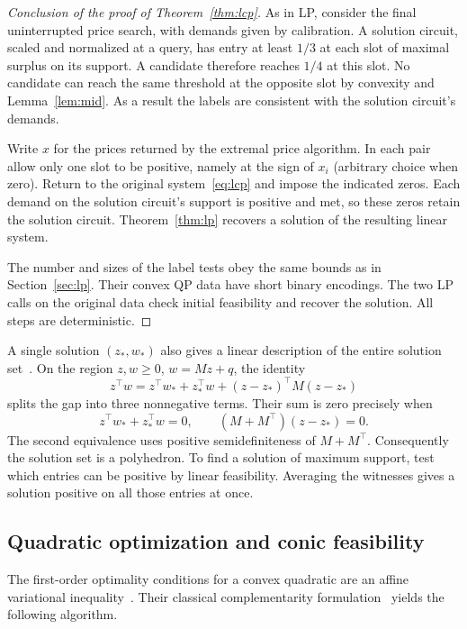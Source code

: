 \begin{proof}[Conclusion of the proof of Theorem~\ref{thm:lcp}]
As in LP, consider the final uninterrupted price search, with demands given by
calibration. A solution circuit, scaled and normalized at a query,
has entry at least \(1/3\) at each slot of maximal surplus on
its support. A candidate therefore reaches \(1/4\) at this slot.
No candidate can reach the same threshold at the opposite slot by convexity and
Lemma~\ref{lem:mid}. As a result the labels are consistent
with the solution circuit's demands.


Write \(x\) for the prices returned by the extremal price algorithm.
In each pair allow only one slot to be positive, namely at the
sign of \(x_i\) (arbitrary choice when zero).
Return to the original system~\eqref{eq:lcp}
and impose the indicated zeros.
Each demand on the solution circuit's support is positive and
met, so these zeros retain the solution circuit. Theorem~\ref{thm:lp}
recovers a solution of the resulting linear system.

The number and sizes of the label tests obey the same bounds as in
Section~\ref{sec:lp}. Their convex QP data have short binary
encodings. The two LP calls on the original data check initial
feasibility and recover the solution. All steps are deterministic.
\end{proof}

A single solution \((z_*,w_*)\) also gives a linear description of
the entire solution set~\cite{Man}. On the region \(z,w\ge0\),
\(w=Mz+q\), the identity
\[
 z^\top w=z^\top w_*+z_*^\top w+(z-z_*)^\top M(z-z_*)
\]
splits the gap into three nonnegative terms. Their sum is zero
precisely when
\[
 z^\top w_*+z_*^\top w=0,\qquad (M+M^\top)(z-z_*)=0 .
\]
The second equivalence uses positive semidefiniteness of \(M+M^\top\).
Consequently the solution set is a polyhedron. To find a solution of
maximum support, test which entries can be positive by linear
feasibility. Averaging the witnesses gives a solution positive on
all those entries at once.

\subsection{Quadratic optimization and conic feasibility}

The first-order optimality conditions for a convex quadratic are
an affine variational inequality~\cite{KT,KuhHist}. Their classical
complementarity formulation~\cite{CD,CPS} yields the following
algorithm.

